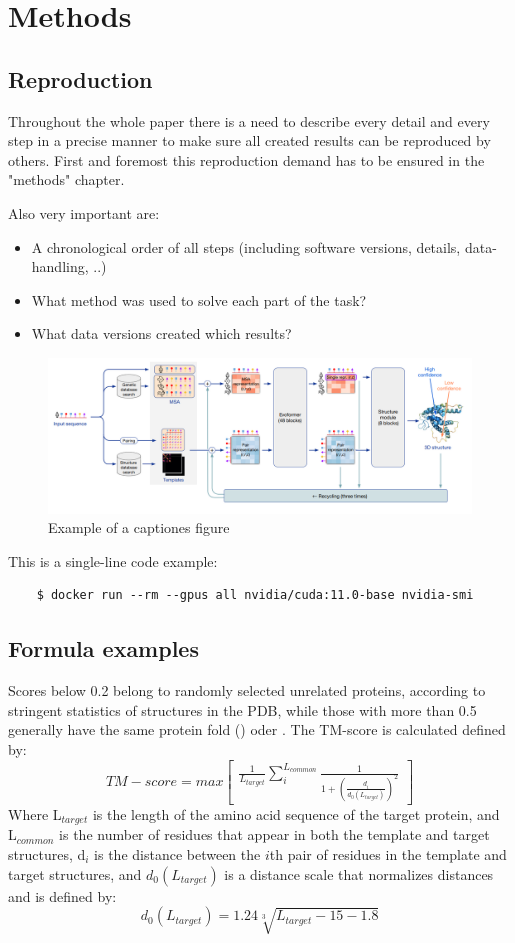 \chapter{Methods}
\section{Reproduction}
Throughout the whole paper there is a need to describe every detail and every
step in a precise manner to make sure all created results can be reproduced by
others. First and foremost this reproduction demand has to be ensured in the
"methods" chapter.

Also very important are:
\begin{itemize}
	\item A chronological order of all steps (including software versions,
	details, data-handling, ..) 
	\item What method was used to solve each part of the task?  
	\item What data versions created which results?
\end{itemize}

\begin{figure}[ht]
    \centering
    \includegraphics[width=1\textwidth]{figures/alphafold_architecture.png}
    \caption{Example of a captiones figure}
    \label{modelarch}
\end{figure}
This is a single-line code example:
\begin{verbatim}
    $ docker run --rm --gpus all nvidia/cuda:11.0-base nvidia-smi
\end{verbatim}
\section{Formula examples}
Scores below 0.2 belong to randomly selected unrelated proteins, according 
to stringent statistics of structures in the \acrshort{PDB}, while those with
more than 0.5 generally have the same protein fold (\cite{Beispiel1}) oder \parencite{Beispiel1}. The TM-score
is calculated defined by:
\[ TM-score = max 
\begin{bmatrix}
\label{complex_formula_1}
\frac{1}{L_{target}}\sum_{i}^{L_{common}} \frac{1}{1+(\frac{d_i}{d_0(L_{target})})^2}
\end{bmatrix}\]
Where L$_{target}$ is the length of the amino acid sequence of the target
protein, and L$_{common}$ is the number of residues that appear in both the
template and target structures, d$_{i}$ is the distance between the $i$th pair
of residues in the template and target structures, and $d_{0} (L_{target})$ is
a distance scale that normalizes distances and is defined by:
\[ d_{0} (L_{target}) = 1.24\sqrt[3]{L_{target}-15-1.8} \]

